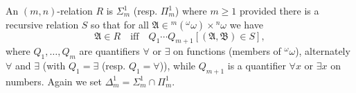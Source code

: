An $(m, n)$-relation $R$ is $\Sigma_m^1$ (resp. $\Pi_m^1$) where $m \geq 1$ provided there is a recursive relation $S$ so that for all $\mathfrak{A} \in {}^m({}^\omega\omega) \times {}^n\omega$ we have
$$\mathfrak{A} \in R \quad \text{iff} \quad Q_1 \cdots Q_{m+1}[(\mathfrak{A}, \mathfrak{B}) \in S],$$
where $Q_1, \ldots, Q_m$ are quantifiers $\forall$ or $\exists$ on functions (members of ${}^\omega\omega$), alternately $\forall$ and $\exists$ (with $Q_1 = \exists$ (resp. $Q_1 = \forall$)), while $Q_{m+1}$ is a quantifier $\forall x$ or $\exists x$ on numbers. Again we set $\Delta_m^1 = \Sigma_m^1 \cap \Pi_m^1$.